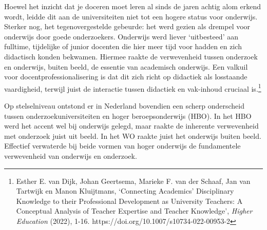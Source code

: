 \documentclass[smallauthor, chapterhaspagenum, nochapterinheader, pagenuminheader,  bigchapnum,medium2, tocpages,  garamond, titleinheader]{jote-book}
\begin{document}
	Hoewel het inzicht dat je doceren moet leren al sinds de jaren achtig alom erkend wordt, leidde dit aan de universiteiten niet tot een hogere status voor onderwijs. Sterker nog, het tegenovergestelde gebeurde: het werd gezien als drempel voor onderwijs door goede onderzoekers. Onderwijs werd liever ‘uitbesteed' aan fulltime, tijdelijke of junior docenten die hier meer tijd voor hadden en zich didactisch konden bekwamen. Hiermee raakte de verwevenheid tussen onderzoek en onderwijs, buiten beeld, de essentie van academisch onderwijs. Een valkuil voor docentprofessionalisering is dat dit zich richt op didactiek als losstaande vaardigheid, terwijl juist de interactie tussen didactiek en vak-inhoud cruciaal is.\footnote{Esther E. van Dijk, Johan Geertsema, Marieke F. van der Schaaf, Jan van Tartwijk en Manon Kluijtmans, ‘Connecting Academics' Disciplinary Knowledge to their Professional Development as University Teachers: A Conceptual Analysis of Teacher Expertise and Teacher Knowledge', \emph{Higher}\emph{ }\emph{Education}\emph{ }(2022), 1-16. https://doi.org/10.1007/s10734-022-00953-2}



	 Op stelselniveau ontstond er in Nederland bovendien een scherp onderscheid tussen onderzoekuniversiteiten en hoger beroepsonderwijs (HBO). In het HBO werd het accent wel bij onderwijs gelegd, maar raakte de inherente verwevenheid met onderzoek juist uit beeld. In het WO raakte juist het onderwijs buiten beeld. Effectief verwaterde bij beide vormen van hoger onderwijs de fundamentele verwevenheid van onderwijs en onderzoek.
\end{document}
